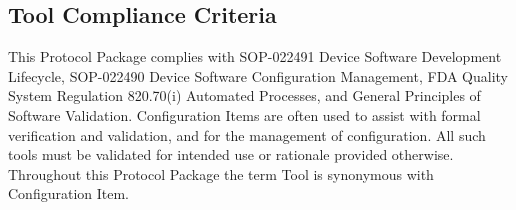 \subsection{Tool Compliance Criteria}
This Protocol Package complies with SOP-022491 Device Software Development
Lifecycle, SOP-022490 Device Software Configuration Management, FDA Quality
System Regulation 820.70(i) Automated Processes, and General Principles of
Software Validation.  Configuration Items are often used to assist with formal
verification and validation, and for the management of configuration.  All such
tools must be validated for intended use or rationale provided otherwise.
Throughout this Protocol Package the term Tool is synonymous with
Configuration Item.
